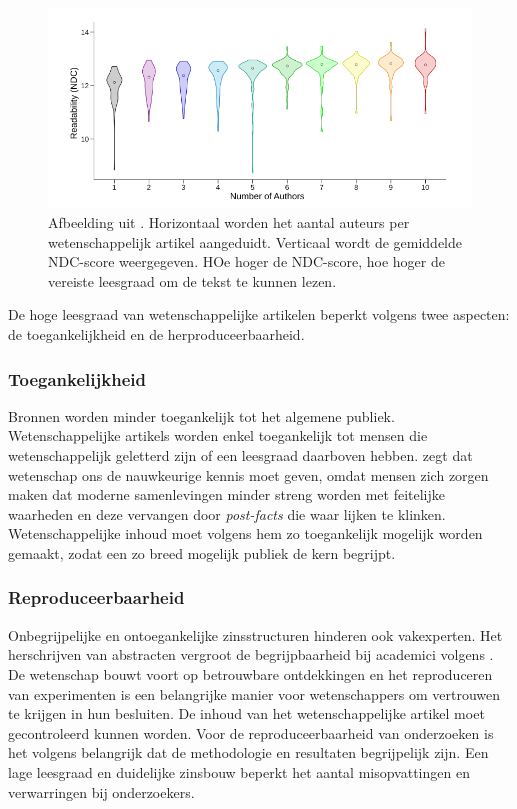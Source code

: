 \begin{figure}[H]
	\includegraphics[width=\linewidth]{img/ndc-number-of-authors.png}
	\caption{Afbeelding uit \textcite{PlavenSigray2017}. Horizontaal worden het aantal auteurs per wetenschappelijk artikel aangeduidt. Verticaal wordt de gemiddelde NDC-score weergegeven. HOe hoger de NDC-score, hoe hoger de vereiste leesgraad om de tekst te kunnen lezen.}
\end{figure}

De hoge leesgraad van wetenschappelijke artikelen beperkt volgens \textcite{PlavenSigray2017} twee aspecten: de toegankelijkheid en de herproduceerbaarheid.

\subsubsection{Toegankelijkheid}

Bronnen worden minder toegankelijk tot het algemene publiek. Wetenschappelijke artikels worden enkel toegankelijk tot mensen die wetenschappelijk geletterd zijn of een leesgraad daarboven hebben. \textcite{Ennals2010} zegt dat wetenschap ons de nauwkeurige kennis moet geven, omdat mensen zich zorgen maken dat moderne samenlevingen minder streng worden met feitelijke waarheden en deze vervangen door \textit{post-facts} die waar lijken te klinken. Wetenschappelijke inhoud moet volgens hem zo toegankelijk mogelijk worden gemaakt, zodat een zo breed mogelijk publiek de kern begrijpt.

\subsubsection{Reproduceerbaarheid}

Onbegrijpelijke en ontoegankelijke zinsstructuren hinderen ook vakexperten. Het herschrijven van abstracten vergroot de begrijpbaarheid bij academici volgens \textcite{Hartley1999, Snow2010}. De wetenschap bouwt voort op betrouwbare ontdekkingen en het reproduceren van experimenten is een belangrijke manier voor wetenschappers om vertrouwen te krijgen in hun besluiten. De inhoud van het wetenschappelijke artikel moet gecontroleerd kunnen worden. Voor de reproduceerbaarheid van onderzoeken is het volgens \textcite{McNutt2014} belangrijk dat de methodologie en resultaten begrijpelijk zijn. Een lage leesgraad en duidelijke zinsbouw beperkt het aantal misopvattingen en verwarringen bij onderzoekers.

